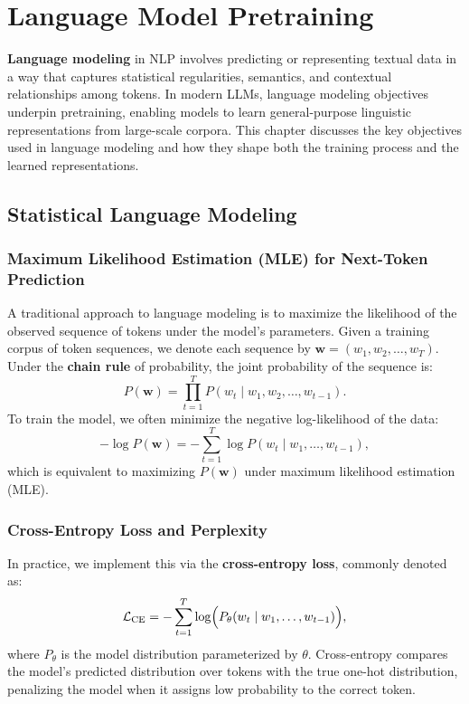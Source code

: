 \chapter{Language Model Pretraining}
\label{chap:lm_pretraining}

\noindent
\textbf{Language modeling} in NLP involves predicting or representing textual data in a way that captures statistical regularities, semantics, and contextual relationships among tokens. In modern LLMs, language modeling objectives underpin pretraining, enabling models to learn general-purpose linguistic representations from large-scale corpora. This chapter discusses the key objectives used in language modeling and how they shape both the training process and the learned representations.

\section{Statistical Language Modeling}
\label{sec:stat_lm}

\subsection{Maximum Likelihood Estimation (MLE) for Next-Token Prediction}
\noindent
A traditional approach to language modeling is to maximize the likelihood of the observed sequence of tokens under the model’s parameters. Given a training corpus of token sequences, we denote each sequence by \(\mathbf{w} = (w_1, w_2, \ldots, w_T)\). Under the \textbf{chain rule} of probability, the joint probability of the sequence is:
\[
P(\mathbf{w}) = \prod_{t=1}^{T} P(w_t \mid w_1, w_2, \ldots, w_{t-1}).
\]
To train the model, we often minimize the negative log-likelihood of the data:
\[
-\log P(\mathbf{w}) = -\sum_{t=1}^{T} \log P(w_t \mid w_1, \ldots, w_{t-1}),
\]
which is equivalent to maximizing \(P(\mathbf{w})\) under maximum likelihood estimation (MLE). 

\subsection{Cross-Entropy Loss and Perplexity}
\noindent
In practice, we implement this via the \textbf{cross-entropy loss}, commonly denoted as:
\[
\mathcal{L}_\text{CE} = -\sum_{t=1}^{T} \log \Bigl( P_{\theta}(w_t \mid w_1, \ldots, w_{t-1}) \Bigr),
\]
where \(P_{\theta}\) is the model distribution parameterized by \(\theta\). Cross-entropy compares the model’s predicted distribution over tokens with the true one-hot distribution, penalizing the model when it assigns low probability to the correct token.

